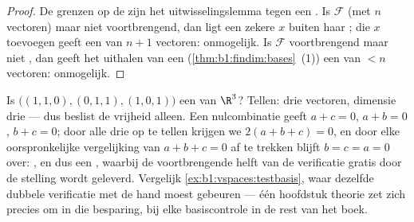 \begin{proof}
De grenzen op de  zijn het uitwisselingslemma tegen
een . Is $\mathcal{F}$ (met $n$ vectoren)  maar niet
voortbrengend, dan ligt een zekere $x$ buiten haar ; die
$x$ toevoegen geeft een  van $n + 1$ vectoren:
onmogelijk. Is $\mathcal{F}$ voortbrengend maar niet , dan geeft
het uithalen van een  (\cref{thm:b1:findim:bases}~(1)) een
 van $< n$ vectoren: onmogelijk.
\end{proof}

\begin{example}
\label{ex:b1:findim:twoofthreerun}
Is $\bigl((1,1,0), (0,1,1), (1,0,1)\bigr)$ een  van $\R^3$?
Tellen: drie vectoren, dimensie drie --- dus beslist de vrijheid
alleen. Een nulcombinatie geeft $a + c = 0$, $a + b = 0$, $b + c =
0$; door alle drie op te tellen krijgen we $2(a + b + c) = 0$, en
door elke oorspronkelijke vergelijking van $a + b + c = 0$ af te
trekken blijft $b = c = a = 0$ over: , en dus een ,
waarbij de voortbrengende helft van de verificatie gratis door de
stelling wordt geleverd. Vergelijk \cref{ex:b1:vspaces:testbasis},
waar dezelfde dubbele verificatie met de hand moest gebeuren ---
één hoofdstuk theorie zet zich precies om in die besparing, bij
elke basiscontrole in de rest van het boek.
\end{example}

